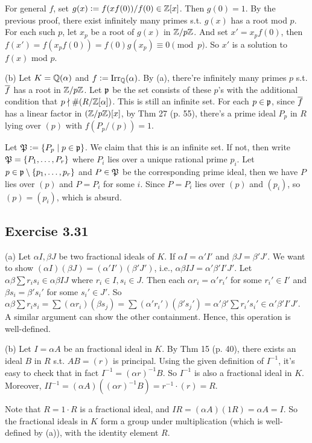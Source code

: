 \documentclass[../Marcus.tex]{subfiles}
\begin{document}
For general $f$, set $g(x):=f(xf(0))/f(0)\in\mathbb{Z}[x]$. Then $g(0)=1$. By the previous proof, there exist infinitely many primes s.t. $g(x)$ has a root mod $p$. For each such $p$, let $x_p$ be a root of $g(x)$ in $\mathbb{Z}/p\mathbb{Z}$. And set $x'=x_pf(0)$, then $f(x')=f(x_pf(0))=f(0)g(x_p)\equiv 0\pmod{p}$. So $x'$ is a solution to $f(x)$ mod $p$.

(b) Let $K=\mathbb{Q}(\alpha)$ and $f:=\operatorname{Irr}_{\mathbb{Q}}(\alpha)$. By (a), there're infinitely many primes $p$ s.t. $\overline{f}$ has a root in $\mathbb{Z}/p\mathbb{Z}$. Let $\mathfrak{p}$ be the set consists of these $p$'s with the additional condition that $p\nmid \#(R/\mathbb{Z}[\alpha])$. This is still an infinite set. For each $p\in\mathfrak{p}$, since $\overline{f}$ has a linear factor in $(\mathbb{Z}/p\mathbb{Z})[x]$, by Thm 27 (p. 55), there's a prime ideal $P_p$ in $R$ lying over $(p)$ with $f(P_p/(p))=1$.

Let $\mathfrak{P}:=\{P_p\mid p\in\mathfrak{p}\}$. We claim that this is an infinite set. If not, then write $\mathfrak{P}=\{P_1,\ldots,P_r\}$ where $P_i$ lies over a unique rational prime $p_i$. Let $p\in\mathfrak{p}\setminus\{p_1,\ldots,p_r\}$ and $P\in\mathfrak{P}$ be the corresponding prime ideal, then we have $P$ lies over $(p)$ and $P=P_i$ for some $i$. Since $P=P_i$ lies over $(p)$ and $(p_i)$, so $(p)=(p_i)$, which is absurd.

\subsection*{Exercise 3.31}

(a) Let $\alpha I,\beta J$ be two fractional ideals of $K$. If $\alpha I=\alpha'I'$ and $\beta J=\beta'J'$. We want to show $(\alpha I)(\beta J)=(\alpha'I')(\beta'J')$, i.e., $\alpha\beta IJ=\alpha'\beta'I'J'$. Let $\alpha\beta\sum r_is_i\in\alpha\beta IJ$ where $r_i\in I,s_i\in J$. Then each $\alpha r_i=\alpha'r_i'$ for some $r_i'\in I'$ and $\beta s_i=\beta's_i'$ for some $s_i'\in J'$. So $\alpha\beta \sum r_is_i=\sum (\alpha r_i)(\beta s_j) = \sum (\alpha'r_i')(\beta's_j') = \alpha'\beta' \sum r_i's_i' \in \alpha'\beta' I'J'$. A similar argument can show the other containment. Hence, this operation is well-defined.

(b) Let $I=\alpha A$ be an fractional ideal in $K$. By Thm 15 (p. 40), there exists an ideal $B$ in $R$ s.t. $AB=(r)$ is principal. Using the given definition of $I^{-1}$, it's easy to check that in fact $I^{-1}=(\alpha r)^{-1}B$. So $I^{-1}$ is also a fractional ideal in $K$. Moreover, $II^{-1}=(\alpha A)((\alpha r)^{-1}B)=r^{-1}\cdot(r)=R$.

Note that $R=1\cdot R$ is a fractional ideal, and $IR=(\alpha A)(1R)=\alpha A=I$. So the fractional ideals in $K$ form a group under multiplication (which is well-defined by (a)), with the identity element $R$.
\end{document}
